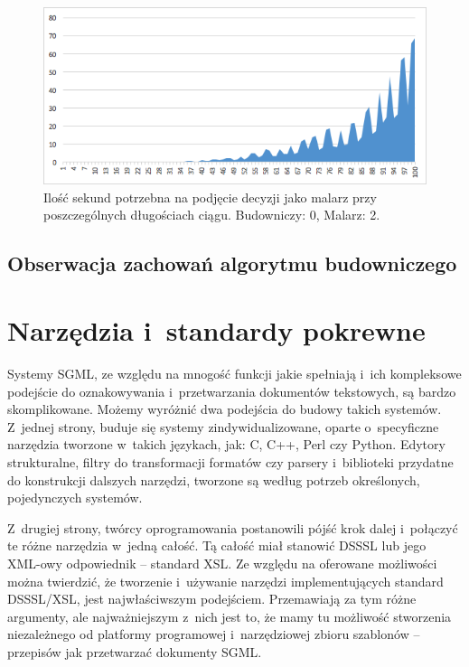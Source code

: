 \documentclass[document]{xmgr}
\begin{document}
\begin{figure}[h]
    \centering
    \includegraphics[scale = 0.7]{images/timePainter2Builder0}
    \caption{Ilość sekund potrzebna na podjęcie decyzji jako malarz przy poszczególnych długościach ciągu. Budowniczy: 0, Malarz: 2.}
    \label{fig:painter2builder0}
\end{figure}


\section{Obserwacja zachowań algorytmu budowniczego}

\chapter{Narzędzia i~standardy pokrewne}

Systemy SGML, ze względu na mnogość funkcji jakie spełniają i~ich
kompleksowe podejście do oznakowywania i~przetwarzania dokumentów
tekstowych, są bardzo skomplikowane. Możemy wyróżnić dwa podejścia do
budowy takich systemów.  Z~jednej strony, buduje się systemy
zindywidualizowane, oparte o~specyficzne narzędzia tworzone w~takich
językach, jak: C, C++, Perl czy Python. Edytory strukturalne, filtry
do transformacji formatów czy parsery i~biblioteki
przydatne do konstrukcji dalszych narzędzi, tworzone są według potrzeb
określonych, pojedynczych systemów.

Z~drugiej strony, twórcy oprogramowania postanowili pójść krok dalej
i~połączyć te różne narzędzia w~jedną całość. Tą całość miał stanowić
DSSSL lub jego XML-owy odpowiednik -- standard XSL. Ze względu na
oferowane możliwości można twierdzić, że tworzenie i~używanie narzędzi
implementujących standard DSSSL/XSL, jest najwłaściwszym
podejściem. Przemawiają za tym różne argumenty, ale najważniejszym
z~nich jest to, że mamy tu możliwość stworzenia niezależnego od
platformy programowej i~narzędziowej zbioru szablonów -- przepisów jak
przetwarzać dokumenty SGML.
\end{document}

